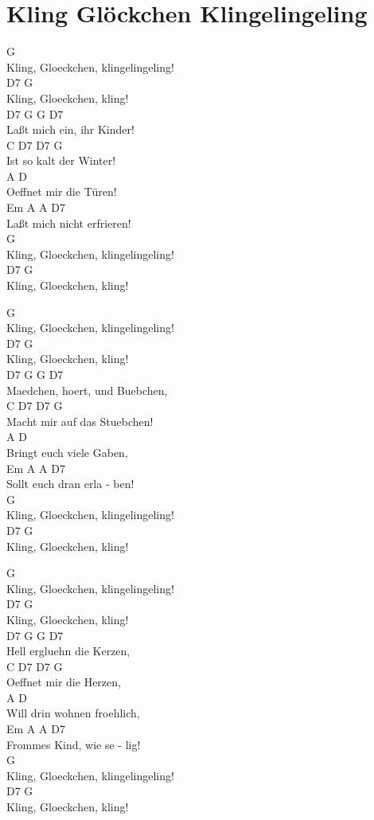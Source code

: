 \documentclass[
  letterpaper,
]{scrbook}
\begin{document}
\hypertarget{kling-gluxf6ckchen-klingelingeling}{%
\chapter{Kling Glöckchen
Klingelingeling}\label{kling-gluxf6ckchen-klingelingeling}}

G\\
Kling, Gloeckchen, klingelingeling!\\
D7 G\\
Kling, Gloeckchen, kling!\\
D7 G G D7\\
Laßt mich ein, ihr Kinder!\\
C D7 D7 G\\
Ist so kalt der Winter!\\
A D\\
Oeffnet mir die Türen!\\
Em A A D7\\
Laßt mich nicht erfrieren!\\
G\\
Kling, Gloeckchen, klingelingeling!\\
D7 G\\
Kling, Gloeckchen, kling!

G\\
Kling, Gloeckchen, klingelingeling!\\
D7 G\\
Kling, Gloeckchen, kling!\\
D7 G G D7\\
Maedchen, hoert, und Buebchen,\\
C D7 D7 G\\
Macht mir auf das Stuebchen!\\
A D\\
Bringt euch viele Gaben,\\
Em A A D7\\
Sollt euch dran erla - ben!\\
G\\
Kling, Gloeckchen, klingelingeling!\\
D7 G\\
Kling, Gloeckchen, kling!

G\\
Kling, Gloeckchen, klingelingeling!\\
D7 G\\
Kling, Gloeckchen, kling!\\
D7 G G D7\\
Hell ergluehn die Kerzen,\\
C D7 D7 G\\
Oeffnet mir die Herzen,\\
A D\\
Will drin wohnen froehlich,\\
Em A A D7\\
Frommes Kind, wie se - lig!\\
G\\
Kling, Gloeckchen, klingelingeling!\\
D7 G\\
Kling, Gloeckchen, kling!
\end{document}
